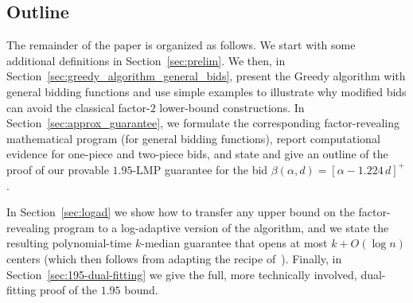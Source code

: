 

\subsection{Outline}

The remainder of the paper is organized as follows. We start with some additional definitions in Section~\ref{sec:prelim}. We then, in Section~\ref{sec:greedy_algorithm_general_bids}, present the Greedy algorithm with general bidding functions and use simple examples to illustrate why modified bids can avoid the classical factor-$2$ lower-bound constructions. In Section~\ref{sec:approx_guarantee}, we formulate the corresponding factor-revealing mathematical program (for general bidding functions), report computational evidence for one-piece and two-piece bids, and state and give an outline of the proof of our provable $1.95$-LMP guarantee for the bid $\beta(\alpha,d)=[\alpha-1.224\,d]^+$.

In Section~\ref{sec:logad} we show how to transfer any upper bound on the factor-revealing program to a log-adaptive version of the algorithm, and we state the resulting polynomial-time $k$-median guarantee that opens at most $k+O(\log n)$ centers (which then follows from adapting the recipe of~\cite{MR4928455-Cohen25}). Finally, in Section~\ref{sec:195-dual-fitting} we give the full, more technically involved, dual-fitting proof of the $1.95$ bound. 
